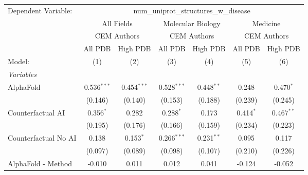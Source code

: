 \begingroup
\centering
\begin{tabular}{lcccccc}
   \tabularnewline \midrule \midrule
   Dependent Variable: & \multicolumn{6}{c}{num\_uniprot\_structures\_w\_disease}\\
 & \multicolumn{2}{c}{All Fields} & \multicolumn{2}{c}{Molecular Biology} & \multicolumn{2}{c}{Medicine} \\
\cmidrule(lr){2-3} \cmidrule(lr){4-5} \cmidrule(lr){6-7}
 & \multicolumn{2}{c}{CEM Authors} & \multicolumn{2}{c}{CEM Authors} & \multicolumn{2}{c}{CEM Authors} \\
\cmidrule(lr){2-3} \cmidrule(lr){4-5} \cmidrule(lr){6-7}
 & \multicolumn{1}{c}{All PDB} & \multicolumn{1}{c}{High PDB} & \multicolumn{1}{c}{All PDB} & \multicolumn{1}{c}{High PDB} & \multicolumn{1}{c}{All PDB} & \multicolumn{1}{c}{High PDB} \\
\cmidrule(lr){2-2} \cmidrule(lr){3-3} \cmidrule(lr){4-4} \cmidrule(lr){5-5} \cmidrule(lr){6-6} \cmidrule(lr){7-7}
   Model:                                                     & (1)           & (2)           & (3)           & (4)           & (5)          & (6)\\  
   \midrule
   \emph{Variables}\\
   AlphaFold                                                  & 0.536$^{***}$ & 0.454$^{***}$ & 0.528$^{***}$ & 0.448$^{**}$  & 0.248        & 0.470$^{*}$\\   
                                                              & (0.146)       & (0.140)       & (0.153)       & (0.188)       & (0.239)      & (0.245)\\   
   Counterfactual AI                                          & 0.356$^{*}$   & 0.282         & 0.288$^{*}$   & 0.173         & 0.414$^{*}$  & 0.467$^{**}$\\   
                                                              & (0.195)       & (0.176)       & (0.166)       & (0.159)       & (0.234)      & (0.223)\\   
   Counterfactual No AI                                       & 0.138         & 0.153$^{*}$   & 0.266$^{***}$ & 0.231$^{**}$  & 0.095        & 0.117\\   
                                                              & (0.097)       & (0.089)       & (0.098)       & (0.107)       & (0.210)      & (0.226)\\   
   AlphaFold - Method                                         & -0.010        & 0.011         & 0.012         & 0.041         & -0.124       & -0.052\\   

\end{tabular}
